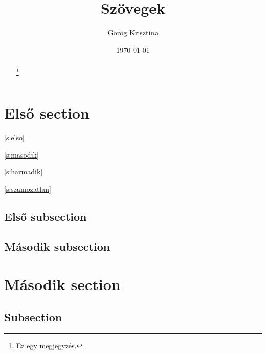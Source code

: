 \documentclass[12pt, twoside]{article}
\title{Szövegek}
\author{Görög Krisztina}
\date{\today}
\begin{document}
\pagestyle{fancy}
\setlength{\headheight}{52pt}

\renewcommand{\footrulewidth}{0.4pt}
\fancyhead[LE,RO]{\thepage}
\fancyhead[LO]{\leftmark}
\fancyhead[RE]{\rightmark}

\renewcommand{\thefootnote}{\fnsymbol{footnote}}
\maketitle

\begin{abstract}
\hulipsum[1]\footnote{Ez egy megjegyzés.}
\end{abstract}

\setcounter{tocdepth}{5}
\tableofcontents
\clearpage

\setcounter{secnumdepth}{5}

\section{Első section}

\autoref{s:elso}

\ref{s:masodik}

\ref{s:harmadik}


\pageref{s:masodik}

\pageref{s:harmadik}

\ref{s:szamozatlan}

\pageref{s:szamozatlan}

\subsection{Első subsection}
\hulipsum
{}\label{s:elso}
\hulipsum[1]

\subsection{Második subsection}
\hulipsum

\section[Második]{Második section}
\subsection{Subsection}
\end{document}
